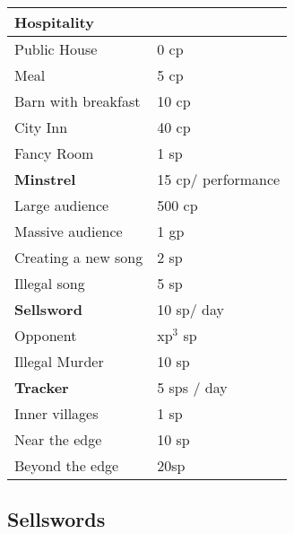 \begin{multicols}{2}
\begin{tabularx}{\linewidth}{XX}
\end{tabularx}

\noindent
\begin{tabularx}{\linewidth}{XX}
\hline
\textbf{Hospitality} &  \\\hline

Public House & 0 \gls{cp} \\

Meal & 5 \gls{cp} \\

Barn with breakfast & 10 \gls{cp} \\

City Inn & 40 \gls{cp} \\

Fancy Room & 1 \gls{sp} \\\hline

\textbf{Minstrel} &  15 \gls{cp}/ performance \\\hline

Large audience & 500 \gls{cp} \\

Massive audience & 1 \gls{gp} \\

Creating a new song & 2 \gls{sp} \\

Illegal song & 5 \gls{sp} \\\hline

\textbf{Sellsword} & 10 \gls{sp}/ day \\\hline

Opponent & \gls{xp}$^3$ \gls{sp} \\

Illegal Murder & 10 \gls{sp} \\\hline

\textbf{Tracker} &  5 \glspl{sp} / day \\\hline

  Inner \glspl{village} & 1 \gls{sp} \\
  Near the \gls{edge} & 10 \gls{sp} \\
  Beyond the \gls{edge} & 20\gls{sp} \\
\hline

\end{tabularx}


\subsection{Sellswords}



\end{multicols}
